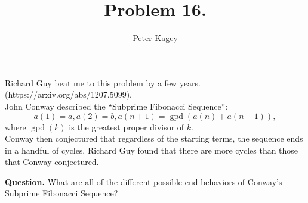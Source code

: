 \documentclass{article}
\newenvironment{question}{\begin{trivlist}\item[\textbf{Question.}]}{\end{trivlist}}
\begin{document}
\title{Problem 16.}
\date{}
\author{Peter Kagey}
\maketitle
  Richard Guy beat me to this problem by a few years. (https://arxiv.org/abs/1207.5099).\\
  John Conway described the ``Subprime Fibonacci Sequence'': \[
    a(1) = a, a(2) = b, a(n + 1) = \operatorname{gpd}(a(n) + a(n - 1)),
  \] where $\operatorname{gpd}(k)$ is the greatest proper divisor of $k$.\\
  Conway then conjectured that regardless of the starting terms, the sequence
  ends in a handful of cycles. Richard Guy found that there are more cycles than
  those that Conway conjectured.

\begin{question}
  What are all of the different possible end behaviors of
  Conway's Subprime Fibonacci Sequence?
\end{question}
\end{document}
